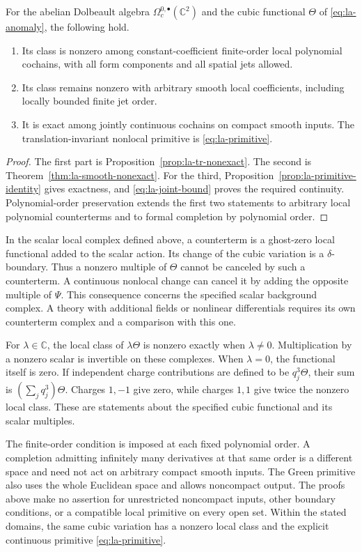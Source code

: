 \begin{theorem}\label{thm:la-three-parts}
For the abelian Dolbeault algebra
$\Omega_c^{0,\bullet}(\mathbb C^2)$ and the cubic functional
$\Theta$ of \eqref{eq:la-anomaly}, the following hold.
\begin{enumerate}
 \item Its class is nonzero among constant-coefficient
 finite-order local polynomial cochains, with all form
 components and all spatial jets allowed.
 \item Its class remains nonzero with arbitrary smooth
 local coefficients, including locally bounded finite jet
 order.
 \item It is exact among jointly continuous cochains on
 compact smooth inputs. The translation-invariant nonlocal
 primitive is \eqref{eq:la-primitive}.
\end{enumerate}
\end{theorem}
\begin{proof}
The first part is Proposition~\ref{prop:la-tr-nonexact}.
The second is Theorem~\ref{thm:la-smooth-nonexact}.
For the third, Proposition~\ref{prop:la-primitive-identity}
gives exactness, and \eqref{eq:la-joint-bound} proves the
required continuity. Polynomial-order preservation extends
the first two statements to arbitrary local polynomial
counterterms and to formal completion by polynomial order.
\end{proof}

In the scalar local complex defined above, a counterterm is
a ghost-zero local functional added to the scalar action.
Its change of the cubic variation is a $\delta$-boundary.
Thus a nonzero multiple of $\Theta$ cannot be canceled by
such a counterterm. A continuous nonlocal change can cancel
it by adding the opposite multiple of $\Psi$.
This consequence concerns the specified scalar background
complex. A theory with additional fields or nonlinear
differentials requires its own counterterm complex and a
comparison with this one.

For $\lambda\in\mathbb C$, the local class of $\lambda\Theta$
is nonzero exactly when $\lambda\ne0$. Multiplication by a
nonzero scalar is invertible on these complexes. When
$\lambda=0$, the functional itself is zero. If independent
charge contributions are defined to be $q_j^3\Theta$, their
sum is $(\sum_jq_j^3)\Theta$. Charges $1,-1$ give zero, while
charges $1,1$ give twice the nonzero local class. These are
statements about the specified cubic functional and its
scalar multiples.

The finite-order condition is imposed at each fixed
polynomial order. A completion admitting infinitely many
derivatives at that same order is a different space and
need not act on arbitrary compact smooth inputs. The Green
primitive also uses the whole Euclidean space and allows
noncompact output. The proofs above make no assertion for
unrestricted noncompact inputs, other boundary conditions,
or a compatible local primitive on every open set. Within
the stated domains, the same cubic variation has a nonzero
local class and the explicit continuous primitive
\eqref{eq:la-primitive}.
